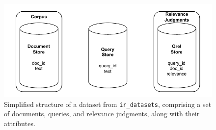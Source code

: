 \begin{figure}[t]
    \centering
    \includegraphics[width=\textwidth]{./graphics/drawio/datasets.pdf}
    \caption{Simplified structure of a dataset from \texttt{ir\_datasets}, comprising a set of documents, queries, and relevance judgments, along with their attributes.}
    \label{fig:datasets}
\end{figure}

